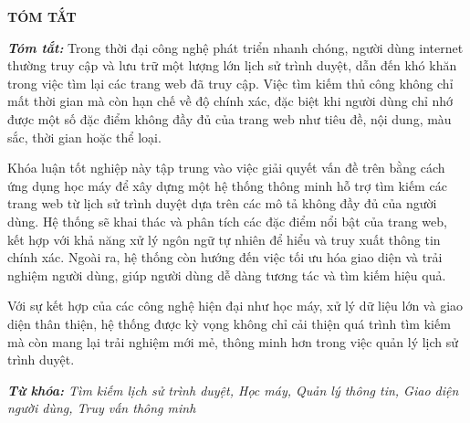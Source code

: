 
\begin{center}
    \textbf{\large TÓM TẮT}
\end{center}
\changefontsizes[16pt]{12pt}

\textit{\textbf{Tóm tắt:}} Trong thời đại công nghệ phát triển nhanh chóng, người dùng internet thường truy cập và lưu trữ một lượng lớn lịch sử trình duyệt, dẫn đến khó khăn trong việc tìm lại các trang web đã truy cập. Việc tìm kiếm thủ công không chỉ mất thời gian mà còn hạn chế về độ chính xác, đặc biệt khi người dùng chỉ nhớ được một số đặc điểm không đầy đủ của trang web như tiêu đề, nội dung, màu sắc, thời gian hoặc thể loại.

Khóa luận tốt nghiệp này tập trung vào việc giải quyết vấn đề trên bằng cách ứng dụng học máy để xây dựng một hệ thống thông minh hỗ trợ tìm kiếm các trang web từ lịch sử trình duyệt dựa trên các mô tả không đầy đủ của người dùng. Hệ thống sẽ khai thác và phân tích các đặc điểm nổi bật của trang web, kết hợp với khả năng xử lý ngôn ngữ tự nhiên để hiểu và truy xuất thông tin chính xác. Ngoài ra, hệ thống còn hướng đến việc tối ưu hóa giao diện và trải nghiệm người dùng, giúp người dùng dễ dàng tương tác và tìm kiếm hiệu quả.

Với sự kết hợp của các công nghệ hiện đại như học máy, xử lý dữ liệu lớn và giao diện thân thiện, hệ thống được kỳ vọng không chỉ cải thiện quá trình tìm kiếm mà còn mang lại trải nghiệm mới mẻ, thông minh hơn trong việc quản lý lịch sử trình duyệt.

\vspace{-0.5cm}
\begin{flushleft}
  \textit{\textbf{Từ khóa:} Tìm kiếm lịch sử trình duyệt, Học máy, Quản lý thông tin, Giao diện người dùng, Truy vấn thông minh}
\end{flushleft}

\newpage
